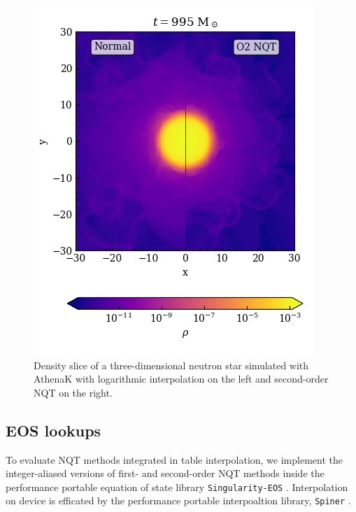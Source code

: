 \documentclass[linenumbers,twocolumn]{aastex631}
\begin{document}
\begin{figure}[tb]
    \centering
    \includegraphics[width=0.9\columnwidth]{figures/athenaknsvolume.png}
    \caption{Density slice of a three-dimensional neutron star simulated with AthenaK with logarithmic interpolation on the left and second-order NQT on the right.}
    \label{fig:TOV:rho}
\end{figure}

\subsection{EOS lookups}
\label{sec:lookups}

To evaluate NQT methods integrated in table interpolation, we implement the integer-aliased versions of first- and second-order NQT methods inside the performance portable equation of state library {\tt Singularity-EOS} \citep{singularityeos}. Interpolation on device is efficated by the performance portable interpoaltion library, {\tt Spiner} \citep{Spiner}.
\end{document}
